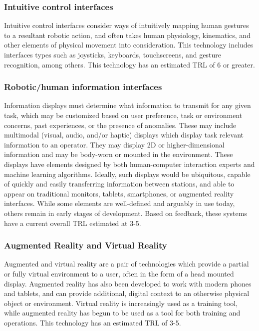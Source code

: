 \subsubsection{Intuitive control interfaces}
Intuitive control interfaces consider ways of intuitively mapping human gestures to a resultant robotic action, and often takes human physiology, kinematics, and other elements of physical movement into consideration.
This technology includes interfaces types such as joysticks, keyboards, touchscreens, and gesture recognition, among others.
This technology has an estimated TRL of 6 or greater.

\subsubsection{Robotic/human information interfaces}
Information displays must determine what information to transmit for any given task, which may be customized based on user preference, task or environment concerns, past experiences, or the presence of anomalies.
These may include multimodal (visual, audio, and/or haptic) displays which display task relevant information to an operator.
They may display 2D or higher-dimensional information and may be body-worn or mounted in the environment.
These displays have elements designed by both human-computer interaction experts and machine learning algorithms.
Ideally, such displays would be ubiquitous, capable of quickly and easily transferring information between stations, and able to appear on traditional monitors, tablets, smartphones, or augmented reality interfaces.
While some elements are well-defined and arguably in use today, others remain in early stages of development.
Based on feedback, these systems have a current overall TRL estimated at 3-5.

\subsubsection{Augmented Reality and Virtual Reality}
Augmented and virtual reality are a pair of technologies which provide a partial or fully virtual environment to a user, often in the form of a head mounted display.
Augmented reality has also been developed to work with modern phones and tablets, and can provide additional, digital context to an otherwise physical object or environment.
Virtual reality is increasingly used as a training tool, while augmented reality has begun to be used as a tool for both training and operations.
This technology has an estimated TRL of 3-5.

